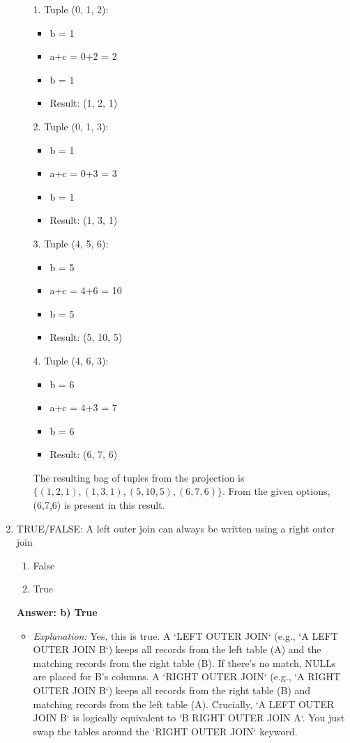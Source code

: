\documentclass{article}
\begin{document}
\begin{enumerate}[label=\textbf{Question \arabic*.}]
\begin{itemize}
        1.  Tuple (0, 1, 2):
            \begin{itemize}
                \item b = 1
                \item a+c = 0+2 = 2
                \item b = 1
                \item Result: (1, 2, 1)
            \end{itemize}
        2.  Tuple (0, 1, 3):
            \begin{itemize}
                \item b = 1
                \item a+c = 0+3 = 3
                \item b = 1
                \item Result: (1, 3, 1)
            \end{itemize}
        3.  Tuple (4, 5, 6):
            \begin{itemize}
                \item b = 5
                \item a+c = 4+6 = 10
                \item b = 5
                \item Result: (5, 10, 5)
            \end{itemize}
        4.  Tuple (4, 6, 3):
            \begin{itemize}
                \item b = 6
                \item a+c = 4+3 = 7
                \item b = 6
                \item Result: (6, 7, 6)
            \end{itemize}
        The resulting bag of tuples from the projection is $\{(1,2,1), (1,3,1), (5,10,5), (6,7,6)\}$.
        From the given options, (6,7,6) is present in this result.
    \end{itemize}

\item TRUE/FALSE: A left outer join can always be written using a right outer join
    \begin{enumerate}[label=\alph*)]
        \item False
        \item True
    \end{enumerate}
    \textbf{Answer: b) True}
    \begin{itemize}
        \item \textit{Explanation:} Yes, this is true. A `LEFT OUTER JOIN` (e.g., `A LEFT OUTER JOIN B`) keeps all records from the left table (A) and the matching records from the right table (B). If there's no match, NULLs are placed for B's columns.
        A `RIGHT OUTER JOIN` (e.g., `A RIGHT OUTER JOIN B`) keeps all records from the right table (B) and matching records from the left table (A).
        Crucially, `A LEFT OUTER JOIN B` is logically equivalent to `B RIGHT OUTER JOIN A`. You just swap the tables around the `RIGHT OUTER JOIN` keyword.
    \end{itemize}


\end{enumerate}
\end{document}
